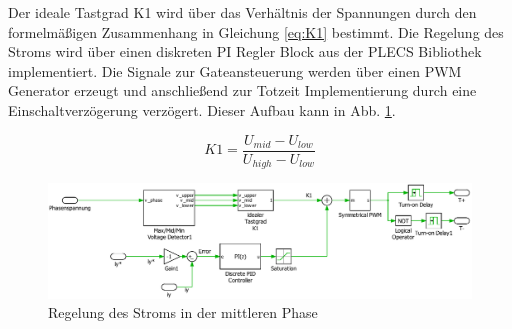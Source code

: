 		Der ideale Tastgrad K1 wird über das Verhältnis der Spannungen durch den formelmäßigen Zusammenhang in Gleichung \ref{eq:K1} bestimmt. Die Regelung des Stroms wird über einen diskreten PI Regler Block aus der PLECS Bibliothek implementiert. Die Signale zur Gateansteuerung werden über einen PWM Generator erzeugt und anschließend zur Totzeit Implementierung durch eine Einschaltverzögerung verzögert. Dieser Aufbau kann in Abb. \ref{fig:plecsiafivsk1}.
		
		\begin{equation}
			\label{eq:K1}
			K1 = \dfrac{U_{mid}- U_{low}}{U_{high} -U_{low}} 
		\end{equation}
		
		\begin{figure}
			\centering
			\includegraphics[width=1\linewidth]{content/Grafiken/PlecsIAFivsK1}
			\caption{Regelung des Stroms in der mittleren Phase}
			\label{fig:plecsiafivsk1}
		\end{figure}
		
	

